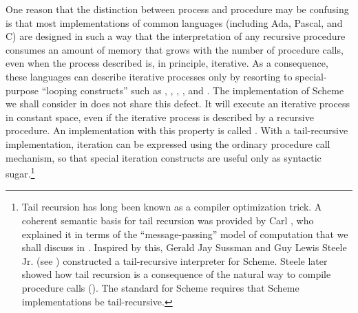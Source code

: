 One reason that the distinction between process and procedure may be confusing
is that most implementations of common languages (including Ada, Pascal, and C)
are designed in such a way that the interpretation of any recursive procedure
consumes an amount of memory that grows with the number of procedure calls,
even when the process described is, in principle, iterative.  As a consequence,
these languages can describe iterative processes only by resorting to
special-purpose ``looping constructs'' such as , ,
, , and .  The implementation of Scheme we
shall consider in  does not share this defect.  It will execute
an iterative process in constant space, even if the iterative process is
described by a recursive procedure.  An implementation with this property is
called .  With a tail-recursive implementation,
iteration can be expressed using the ordinary procedure call mechanism, so that
special iteration constructs are useful only as syntactic sugar.\footnote{Tail
recursion has long been known as a compiler optimization trick.  A coherent
semantic basis for tail recursion was provided by Carl , who
explained it in terms of the ``message-passing'' model of computation that we
shall discuss in .  Inspired by this, Gerald Jay Sussman and Guy
Lewis Steele Jr. (see ) constructed a tail-recursive interpreter for
Scheme.  Steele later showed how tail recursion is a consequence of the natural
way to compile procedure calls ().  The  standard for
Scheme requires that Scheme implementations be tail-recursive.}

